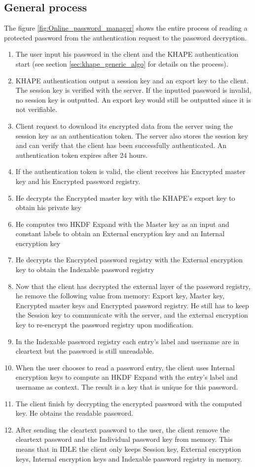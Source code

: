 \documentclass[../report.tex]{subfiles}
\begin{document}
\subsection{General process}
The figure \ref{fig:Online_password_manager} shows the entire process of reading a protected password from the authentication request to the password decryption.
\begin{enumerate}
 \item The user input his password in the client and the KHAPE authentication start (see section \ref{sec:khape_generic_algo} for details on the process).
 \item KHAPE authentication output a session key and an export key to the client. The session key is verified with the server. If the inputted password is invalid, no session key is outputted. An export key would still be outputted since it is not verifiable.
 \item Client request to download its encrypted data from the server using the session key as an authentication token. The server also stores the session key and can verify that the client has been successfully authenticated. An authentication token expires after 24 hours.
 \item If the authentication token is valid, the client receives his Encrypted master key and his Encrypted password registry.
 \item He decrypts the Encrypted master key with the KHAPE's export key to obtain his private key
 \item He computes two HKDF Expand with the Master key as an input and constant labels to obtain an External encryption key and an Internal encryption key
 \item He decrypts the Encrypted password registry with the External encryption key to obtain the Indexable password registry
 \item Now that the client has decrypted the external layer of the password registry, he remove the following value from memory: Export key, Master key, Encrypted master keys and Encrypted password registry. He still has to keep the Session key to communicate with the server, and the external encryption key to re-encrypt the password registry upon modification.
 \item In the Indexable password registry each entry's label and username are in cleartext but the password is still unreadable. 
 \item When the user chooses to read a password entry, the client uses Internal encryption keys to compute an HKDF Expand with the entry's label and username as context. The result is a key that is unique for this password.
 \item The client finish by decrypting the encrypted password with the computed key. He obtains the readable password.
 \item After sending the cleartext password to the user, the client remove the cleartext password and the Individual password key from memory. This means that in IDLE the client only keeps Session key, External encryption keys, Internal encryption keys and Indexable password registry in memory.
\end{enumerate}
\end{document}
